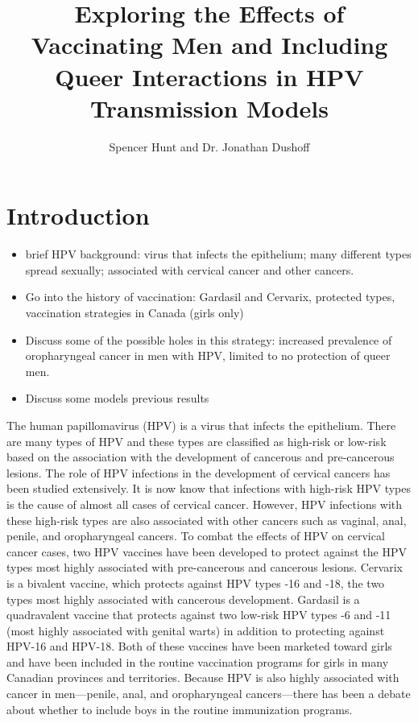 \documentclass[12pt]{article}
\title{Exploring the Effects of Vaccinating Men and Including Queer Interactions in HPV Transmission Models}
\author{Spencer Hunt and Dr. Jonathan Dushoff}
\begin{document}
\maketitle

\section{Introduction}
\begin{itemize}
\item brief HPV background: virus that infects the epithelium; many different types spread sexually; associated with cervical cancer and other cancers.
\item Go into the history of vaccination: Gardasil and Cervarix, protected types, vaccination strategies in Canada (girls only)
\item Discuss some of the possible holes in this strategy: increased prevalence of oropharyngeal cancer in men with HPV, limited to no protection of queer men. 
\item Discuss some models previous results
\end{itemize}

The human papillomavirus (HPV) is a virus that infects the epithelium.  There are many types of HPV and these types are classified as high-risk or low-risk based on the association with the development of cancerous and pre-cancerous lesions.  The role of HPV infections in the development of cervical cancers has been studied extensively.  It is now know that infections with high-risk HPV types is the cause of almost all cases of cervical cancer.  However, HPV infections with these high-risk types are also associated with other cancers such as vaginal, anal, penile, and oropharyngeal cancers.  To combat the effects of HPV on cervical cancer cases, two HPV vaccines have been developed to protect against the HPV types most highly associated with pre-cancerous and cancerous lesions. Cervarix is a bivalent vaccine, which protects against HPV types -16 and -18, the two types most highly associated with cancerous development.  Gardasil is a quadravalent vaccine that protects against two low-risk HPV types -6 and -11 (most highly associated with genital warts) in addition to protecting against HPV-16 and HPV-18.  Both of these vaccines have been marketed toward girls and have been included in the routine vaccination programs for girls in many Canadian provinces and territories.  Because HPV is also highly associated with cancer in men---penile, anal, and oropharyngeal cancers---there has been a debate about whether to include boys in the routine immunization programs.  
\end{document}
